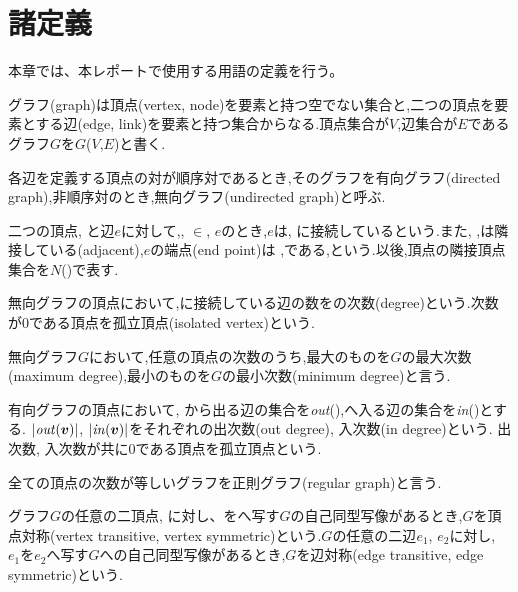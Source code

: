 \documentclass[specialreport]{subfiles}
\begin{document}
\section{諸定義}
本章では、本レポートで使用する用語の定義を行う。

\begin{defi}
グラフ(graph)は頂点(vertex, node)を要素と持つ空でない集合と,二つの頂点を要素とする辺(edge, link)を要素と持つ集合からなる.頂点集合が$V$,辺集合が$E$であるグラフ$G$を$G$($V$,$E$)と書く.
\end{defi}

\begin{defi}
各辺を定義する頂点の対が順序対であるとき,そのグラフを有向グラフ(directed graph),非順序対のとき,無向グラフ(undirected graph)と呼ぶ.
\end{defi}

\begin{defi}
二つの頂点{\vu}, {\vv}と辺$e$に対して,{\vu}, {\vv}$\in$, $e$のとき,$e$は{\vu}, {\vv}に接続しているという.また,{\vu} ,{\vv}は隣接している(adjacent),$e$の端点(end point)は{\vu} ,{\vv}である,という.以後,頂点{\vv}の隣接頂点集合を$N$({\vv})で表す.
\end{defi}

\begin{defi}
無向グラフの頂点{\vv}において,{\vv}に接続している辺の数を{\vv}の次数(degree)という.次数が0である頂点を孤立頂点(isolated vertex)という.
\end{defi}

\begin{defi}
無向グラフ$G$において,任意の頂点の次数のうち,最大のものを$G$の最大次数(maximum degree),最小のものを$G$の最小次数(minimum degree)と言う.
\end{defi}

\begin{defi}
有向グラフの頂点{\vv}において, {\vv}から出る辺の集合を{\it out}({\vv}),{\vv}へ入る辺の集合を{\it in}({\vv})とする. $|{\it out}({\mbox{\boldmath $v$}})|$, $|{\it in}({\mbox{\boldmath $v$}})|$をそれぞれ{\vv}の出次数(out degree), 入次数(in degree)という. 出次数, 入次数が共に0である頂点を孤立頂点という.
\end{defi}

\begin{defi}
全ての頂点の次数が等しいグラフを正則グラフ(regular graph)と言う.
\end{defi}

\begin{defi}
グラフ$G$の任意の二頂点{\vu}, {\vv}に対し、{\vu}を{\vv}へ写す$G$の自己同型写像があるとき,$G$を頂点対称(vertex transitive, vertex symmetric)という.$G$の任意の二辺$e_1$, $e_2$に対し, $e_1$を$e_2$へ写す$G$への自己同型写像があるとき,$G$を辺対称(edge transitive, edge symmetric)という.
\end{defi}
\end{document}
